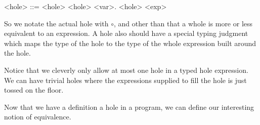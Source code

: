\documentclass[12pt]{article}
\begin{document}
\begin{grammar}
  <hole> ::= \circ
  \alt <hole> <hole>
  \alt \lambda <var>. <hole>
  \alt <exp>
\end{grammar}

So we notate the actual hole with $ \circ $, and other than that a whole
is more or less equivalent to an expression. A hole also should have a
special typing judgment which maps the type of the hole to the type of
the whole expression built around the hole.

Notice that we cleverly only allow at most one hole in a typed hole
expression. We can have trivial holes where the expressions
supplied to fill the hole is just tossed on the floor.

Now that we have a definition a hole in a program, we can define
our interesting notion of equivalence.
\end{document}
